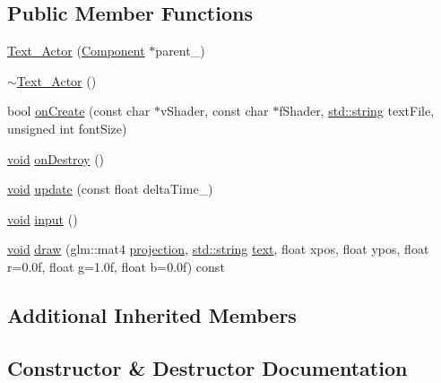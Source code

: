 \subsection*{Public Member Functions}
\begin{DoxyCompactItemize}
\item 
\hyperlink{classText__Actor_a5d0932b7902bb86583c36c589931d069}{Text\+\_\+\+Actor} (\hyperlink{classComponent}{Component} $\ast$parent\+\_\+)
\item 
\hyperlink{classText__Actor_af327288b1330371a17070fb499f8d54c}{$\sim$\+Text\+\_\+\+Actor} ()
\item 
bool \hyperlink{classText__Actor_a07ecf27d5a9e6b29187a9d0e6a47d4a2}{on\+Create} (const char $\ast$v\+Shader, const char $\ast$f\+Shader, \hyperlink{imgui__impl__opengl3__loader_8h_ac83513893df92266f79a515488701770}{std\+::string} text\+File, unsigned int font\+Size)
\item 
\hyperlink{imgui__impl__opengl3__loader_8h_ac668e7cffd9e2e9cfee428b9b2f34fa7}{void} \hyperlink{classText__Actor_af9b25da889aad4aec6f17671c37ac431}{on\+Destroy} ()
\item 
\hyperlink{imgui__impl__opengl3__loader_8h_ac668e7cffd9e2e9cfee428b9b2f34fa7}{void} \hyperlink{classText__Actor_a26181e1102ab2a37ec8b140c999a6f6a}{update} (const float delta\+Time\+\_\+)
\item 
\hyperlink{imgui__impl__opengl3__loader_8h_ac668e7cffd9e2e9cfee428b9b2f34fa7}{void} \hyperlink{classText__Actor_acbb29cf3a69e2858880e6f680f395579}{input} ()
\item 
\hyperlink{imgui__impl__opengl3__loader_8h_ac668e7cffd9e2e9cfee428b9b2f34fa7}{void} \hyperlink{classText__Actor_a7d39e279f8491521f213a8f3dc5309a9}{draw} (glm\+::mat4 \hyperlink{main__menu__state_8cpp_a565d92bfbcc4a481d2d35f3850a382f7}{projection}, \hyperlink{imgui__impl__opengl3__loader_8h_ac83513893df92266f79a515488701770}{std\+::string} \hyperlink{game__play__state_8cpp_a295b62c787445f811e691da4b10f6be4}{text}, float xpos, float ypos, float r=0.\+0f, float g=1.\+0f, float b=0.\+0f) const
\end{DoxyCompactItemize}
\subsection*{Additional Inherited Members}


\subsection{Constructor \& Destructor Documentation}
\mbox{\label{classText__Actor_a5d0932b7902bb86583c36c589931d069}} 
